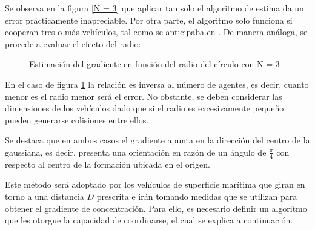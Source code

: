 Se observa en la figura \ref{N = 3} que aplicar tan solo el algoritmo de estima da un error prácticamente inapreciable. Por otra parte, el algoritmo solo funciona si cooperan tres o más vehículos, tal como se anticipaba en \cite{Estimacion_Gradiente}. De manera análoga, se procede a evaluar el efecto del radio:

\begin{figure}[H]
  \begin{center}
    \caption{Estimación del gradiente en función del radio del círculo con N = 3}
    \label{VARD}
  \end{center}
\end{figure}

En el caso de figura \ref{VARD} la relación es inversa al número de agentes, es decir, cuanto menor es el radio menor será el error. No obstante, se deben considerar las dimensiones de los vehículos dado que si el radio es excesivamente pequeño pueden generarse colisiones entre ellos.

Se destaca que en ambos casos el gradiente apunta en la dirección del centro de la gaussiana, es decir, presenta una orientación en razón de un ángulo de $\frac{\pi}{4}$ con respecto al centro de la formación ubicada en el origen.

Este método será adoptado por los vehículos de superficie marítima que giran en torno a una distancia $D$ prescrita e irán tomando medidas que se utilizan para obtener el gradiente de concentración. Para ello, es necesario definir un algoritmo que les otorgue la capacidad de coordinarse, el cual se explica a continuación.

